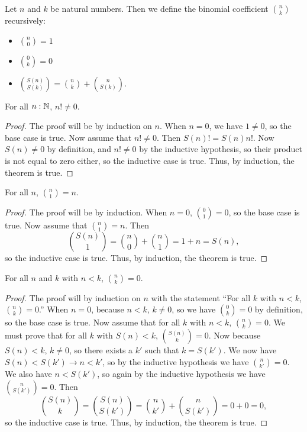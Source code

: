 \documentclass[../../math.tex]{subfiles}
\begin{document}
\begin{definition}
    Let $n$ and $k$ be natural numbers.  Then we define the binomial coefficient
    $\binom{n}{k}$ recursively:
    \begin{itemize}
        \item $\displaystyle \binom{n}{0} = 1$
        \item $\displaystyle \binom{0}{k} = 0$
        \item $\displaystyle \binom{S(n)}{S(k)} = \binom{n}{k} +
            \binom{n}{S(k)}$.
    \end{itemize}
\end{definition}

\begin{theorem} \label{factorial_nz}
    For all $n : \mathbb{N}$, $n! \neq 0$.
\end{theorem}
\begin{proof}
    The proof will be by induction on $n$.  When $n = 0$, we have $1 \neq 0$, so
    the base case is true.  Now assume that $n! \neq 0$.  Then $S(n)! = S(n)
    n!$.  Now $S(n) \neq 0$ by definition, and $n! \neq 0$ by the inductive
    hypothesis, so their product is not equal to zero either, so the inductive
    case is true.  Thus, by induction, the theorem is true.
\end{proof}

\begin{theorem}
    For all $n$, $\displaystyle \binom{n}{1} = n$.
\end{theorem}
\begin{proof}
    The proof will be by induction.  When $n = 0$, $\binom{0}{1} = 0$, so the
    base case is true.  Now assume that $\binom{n}{1} = n$.  Then
    \[
        \binom{S(n)}{1} = \binom{n}{0} + \binom{n}{1} = 1 + n = S(n),
    \]
    so the inductive case is true.  Thus, by induction, the theorem is true.
\end{proof}

\begin{theorem} \label{binom_greater}
    For all $n$ and $k$ with $n < k$, $\displaystyle \binom{n}{k} = 0$.
\end{theorem}
\begin{proof}
    The proof will by induction on $n$ with the statement ``For all $k$ with $n
    < k$, $\binom{n}{k} = 0$.''  When $n = 0$, because $n < k$, $k \neq 0$, so
    we have $\binom{0}{k} = 0$ by definition, so the base case is true.  Now
    assume that for all $k$ with $n < k$, $\binom{n}{k} = 0$.  We must prove
    that for all $k$ with $S(n) < k$, $\binom{S(n)}{k} = 0$.  Now because $S(n)
    < k$, $k \neq 0$, so there exists a $k'$ such that $k = S(k')$.  We now have
    $S(n) < S(k') \rightarrow n < k'$, so by the inductive hypothesis we have
    $\binom{n}{k'} = 0$.  We also have $n < S(k')$, so again by the inductive
    hypothesis we have $\binom{n}{S(k')} = 0$.  Then
    \[
        \binom{S(n)}{k} = \binom{S(n)}{S(k')} = \binom{n}{k'} + \binom{n}{S(k')}
        = 0 + 0 = 0,
    \]
    so the inductive case is true.  Thus, by induction, the theorem is true.
\end{proof}
\end{document}
